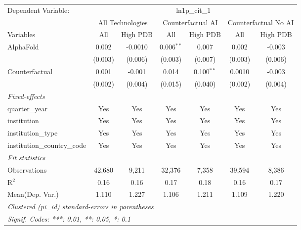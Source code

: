 \begingroup
\centering
\begin{tabular}{lcccccc}
   \tabularnewline \midrule \midrule
   Dependent Variable: & \multicolumn{6}{c}{ln1p\_cit\_1}\\
 & \multicolumn{2}{c}{All Technologies} & \multicolumn{2}{c}{Counterfactual AI} & \multicolumn{2}{c}{Counterfactual No AI} \\
\cmidrule(lr){1-1}\cmidrule(lr){2-3} \cmidrule(lr){4-5} \cmidrule(lr){6-7}
Variables & \multicolumn{1}{c}{All} & \multicolumn{1}{c}{High PDB} & \multicolumn{1}{c}{All} & \multicolumn{1}{c}{High PDB} & \multicolumn{1}{c}{All} & \multicolumn{1}{c}{High PDB} \\
\cmidrule(lr){1-1}\cmidrule(lr){2-2} \cmidrule(lr){3-3} \cmidrule(lr){4-4} \cmidrule(lr){5-5} \cmidrule(lr){6-6} \cmidrule(lr){7-7}
   AlphaFold                    & 0.002   & -0.0010 & 0.006$^{**}$ & 0.007        & 0.002   & -0.003\\   
                                & (0.003) & (0.006) & (0.003)      & (0.007)      & (0.003) & (0.006)\\   
   Counterfactual               & 0.001   & -0.001  & 0.014        & 0.100$^{**}$ & 0.0010  & -0.003\\   
                                & (0.002) & (0.004) & (0.015)      & (0.040)      & (0.002) & (0.004)\\   
   \midrule
   \emph{Fixed-effects}\\
   quarter\_year                & Yes     & Yes     & Yes          & Yes          & Yes     & Yes\\  
   institution                  & Yes     & Yes     & Yes          & Yes          & Yes     & Yes\\  
   institution\_type            & Yes     & Yes     & Yes          & Yes          & Yes     & Yes\\  
   institution\_country\_code   & Yes     & Yes     & Yes          & Yes          & Yes     & Yes\\  
   \midrule
   \emph{Fit statistics}\\
   Observations                 & 42,680  & 9,211   & 32,376       & 7,358        & 39,594  & 8,386\\  
   R$^2$                        & 0.16    & 0.16    & 0.17         & 0.18         & 0.16    & 0.17\\  
Mean(Dep. Var.) & 1.110 & 1.227 & 1.106 & 1.211 & 1.109 & 1.220 \\
   \midrule \midrule
   \multicolumn{7}{l}{\emph{Clustered (pi\_id) standard-errors in parentheses}}\\
   \multicolumn{7}{l}{\emph{Signif. Codes: ***: 0.01, **: 0.05, *: 0.1}}\\
\end{tabular}
\par\endgroup
